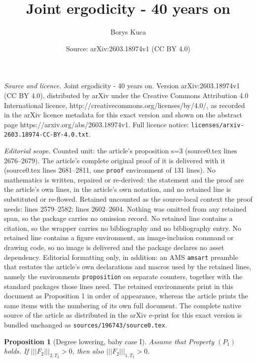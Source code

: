 \documentclass[10pt,a4paper]{amsart}
\title{Joint ergodicity - 40 years on}
\author{Borys Kuca}
\date{Source: arXiv:2603.18974v1 (CC BY 4.0)}
\newtheorem{proposition}{Proposition}
\newcommand{\nnorm}[1]{\lvert\!|\!| #1|\!|\!\rvert}
\begin{document}
\maketitle

\noindent\emph{Source and licence.} Joint ergodicity - 40 years on. Version arXiv:2603.18974v1 (CC BY 4.0), distributed by arXiv under the Creative Commons Attribution 4.0 International licence, http://creativecommons.org/licenses/by/4.0/, as recorded in the arXiv licence metadata for this exact version and shown on the abstract page https://arxiv.org/abs/2603.18974v1. Full licence notice: \texttt{licenses/arxiv-2603.18974-CC-BY-4.0.txt}.\par\smallskip

\noindent\textit{Editorial scope.} Counted unit: the article's proposition s=3 (source0.tex lines 2676--2679). The article's complete original proof of it is delivered with it (source0.tex lines 2681--2811, one \texttt{proof} environment of 131 lines). No mathematics is written, repaired or re-derived: the statement and the proof are the article's own lines, in the article's own notation, and no retained line is substituted or re-flowed.  Retained uncounted as the source-local context the proof needs: lines 2579--2582; lines 2602--2604.  Nothing was omitted from any retained span, so the package carries no omission record.  No retained line contains a citation, so the wrapper carries no bibliography and no bibliography entry.  No retained line contains a figure environment, an image-inclusion command or drawing code, so no image is delivered and the package declares no asset dependency.  Editorial formatting only, in addition: an AMS \texttt{amsart} preamble that restates the article's own declarations and macros used by the retained lines, namely the environments \texttt{proposition} on separate counters, together with the standard packages those lines need.  The retained environments print in this document as Proposition 1 in order of appearance, whereas the article prints the same items with the numbering of its own full document.  The complete native source of the article as distributed in the arXiv e-print for this exact version is bundled unchanged as \texttt{sources/196743/source0.tex}.
\begin{proposition}[Degree lowering, baby case I]\label{P: degree lowering s=2}
    Assume %
    that Property $(P_1)$ holds. If $\nnorm{F_2}_{2, T_2}>0$, then also $\nnorm{F_2}_{1, T_2}>0$. 
\end{proposition}
\end{document}
